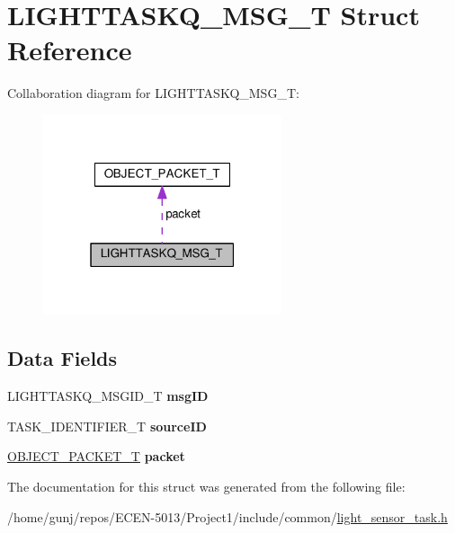 \hypertarget{structLIGHTTASKQ__MSG__T}{}\section{L\+I\+G\+H\+T\+T\+A\+S\+K\+Q\+\_\+\+M\+S\+G\+\_\+T Struct Reference}
\label{structLIGHTTASKQ__MSG__T}


Collaboration diagram for L\+I\+G\+H\+T\+T\+A\+S\+K\+Q\+\_\+\+M\+S\+G\+\_\+T\+:
\nopagebreak
\begin{figure}[H]
\begin{center}
\leavevmode
\includegraphics[width=199pt]{structLIGHTTASKQ__MSG__T__coll__graph}
\end{center}
\end{figure}
\subsection*{Data Fields}
\begin{DoxyCompactItemize}
\item 
L\+I\+G\+H\+T\+T\+A\+S\+K\+Q\+\_\+\+M\+S\+G\+I\+D\+\_\+T {\bfseries msg\+ID}\hypertarget{structLIGHTTASKQ__MSG__T_a6d0d6fad55adda1f3922616bc34a7902}{}\label{structLIGHTTASKQ__MSG__T_a6d0d6fad55adda1f3922616bc34a7902}

\item 
T\+A\+S\+K\+\_\+\+I\+D\+E\+N\+T\+I\+F\+I\+E\+R\+\_\+T {\bfseries source\+ID}\hypertarget{structLIGHTTASKQ__MSG__T_a73522367ea6c6c3c9a3e98a817d4c50f}{}\label{structLIGHTTASKQ__MSG__T_a73522367ea6c6c3c9a3e98a817d4c50f}

\item 
\hyperlink{structOBJECT__PACKET__T}{O\+B\+J\+E\+C\+T\+\_\+\+P\+A\+C\+K\+E\+T\+\_\+T} {\bfseries packet}\hypertarget{structLIGHTTASKQ__MSG__T_a9ab5b74f39c56fe79cabf08e00bcd339}{}\label{structLIGHTTASKQ__MSG__T_a9ab5b74f39c56fe79cabf08e00bcd339}

\end{DoxyCompactItemize}


The documentation for this struct was generated from the following file\+:\begin{DoxyCompactItemize}
\item 
/home/gunj/repos/\+E\+C\+E\+N-\/5013/\+Project1/include/common/\hyperlink{light__sensor__task_8h}{light\+\_\+sensor\+\_\+task.\+h}\end{DoxyCompactItemize}
